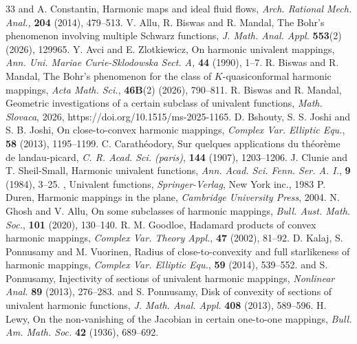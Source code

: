 \documentclass[11pt,reqno]{amsart}
\newtheorem{open problem}{Open problem}[section]
\numberwithin{equation}{section}
\begin{document}
\begin{thebibliography}{33}
 and {\sc A. Constantin}, Harmonic maps and ideal fluid flows, {\it Arch. Rational Mech. Anal.,} {\bf 204} (2014), 479--513.
 {V. Allu, R. Biswas} and {\sc R. Mandal}, The Bohr's phenomenon involving multiple Schwarz functions, {\it J. Math. Anal. Appl.} {\bf553}(2) (2026), 129965. 
 {\sc Y. Avci} and {\sc E. Zlotkiewicz}, On harmonic univalent mappings, {\it Ann. Uni. Mariae Curie-Sklodowska Sect. A,} {\bf44} (1990), 1--7.
 {\sc R. Biswas} and {\sc R. Mandal}, The Bohr's phenomenon for the class of $K$-quasiconformal harmonic mappings, {\it Acta Math. Sci.}, {\bf46B}(2) (2026), 790--811.
  {\sc R. Biswas} and {\sc R. Mandal}, Geometric investigations of a certain subclass of univalent functions, \textit{Math. Slovaca}, 2026, https://doi.org/10.1515/ms-2025-1165.
 {\sc D. Bshouty, S. S. Joshi} and {\sc S. B. Joshi}, On close-to-convex harmonic mappings, {\it Complex Var. Elliptic Equ.}, {\bf58} (2013), 1195--1199.
 {\sc C. Carath\'{e}odory}, Sur quelques applications du th\'{e}or\`{e}me de landau-picard, {\it C. R. Acad. Sci. (paris)}, {\bf144} (1907), 1203--1206.
 {\sc J. Clunie} and {\sc T. Sheil-Small}, Harmonic univalent functions, {\it Ann. Acad. Sci. Fenn. Ser. A. I.}, {\bf9} (1984), 3--25.
, Univalent functions, {\it Springer-Verlag}, New York inc., 1983
 {\sc P. Duren}, Harmonic mappings in the plane, {\it Cambridge University Press}, 2004.
 {\sc N. Ghosh} and {\sc V. Allu}, On some subclasses of harmonic mappings, {\it Bull. Aust. Math. Soc.}, {\bf101} (2020), 130--140.
 {\sc R. M. Goodloe}, Hadamard products of convex harmonic mappings, {\it Complex Var. Theory Appl.}, {\bf47} (2002), 81--92. 
 {\sc D. Kalaj, S. Ponnusamy} and {\sc M. Vuorinen}, Radius of close-to-convexity and full starlikeness of harmonic mappings, {\it Complex Var. Elliptic Equ.}, {\bf59} (2014), 539--552.
 and {\sc S. Ponnusamy}, Injectivity of sections of univalent harmonic mappings, {\it Nonlinear Anal.} {\bf89} (2013), 276--283.
 and {\sc S. Ponnusamy}, Disk of convexity of sections of univalent harmonic functions, {\it J. Math. Anal. Appl.} {\bf408} (2013), 589--596.
 {\sc H. Lewy}, On the non-vanishing of the Jacobian in certain one-to-one mappings, {\it Bull. Am. Math. Soc.} {\bf42} (1936), 689--692.

\end{thebibliography}
\end{document}
